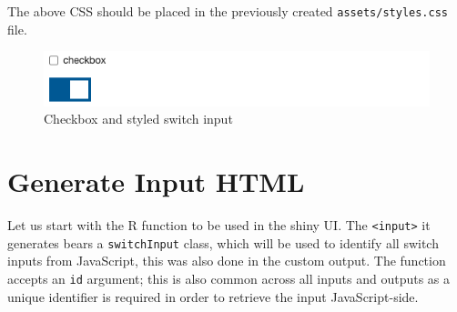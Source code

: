 \documentclass[10pt,]{krantz}
\makeatletter
\newenvironment{Shaded}{\begin{snugshade}}{\end{snugshade}}
\newcommand{\CommentTok}[1]{\textcolor[rgb]{0.37,0.37,0.37}{\textit{#1}}}
\newcommand{\ConstantTok}[1]{\textcolor[rgb]{0,0,0}{#1}}
\newcommand{\ControlFlowTok}[1]{\textcolor[rgb]{0.27,0.27,0.27}{\textbf{#1}}}
\newcommand{\DataTypeTok}[1]{\textcolor[rgb]{0.27,0.27,0.27}{#1}}
\newcommand{\DecValTok}[1]{\textcolor[rgb]{0.06,0.06,0.06}{#1}}
\newcommand{\FunctionTok}[1]{\textcolor[rgb]{0,0,0}{#1}}
\newcommand{\InformationTok}[1]{\textcolor[rgb]{0.37,0.37,0.37}{\textbf{\textit{#1}}}}
\newcommand{\KeywordTok}[1]{\textcolor[rgb]{0.27,0.27,0.27}{\textbf{#1}}}
\newcommand{\NormalTok}[1]{#1}
\newcommand{\OperatorTok}[1]{\textcolor[rgb]{0.43,0.43,0.43}{\textbf{#1}}}
\newcommand{\StringTok}[1]{\textcolor[rgb]{0.5,0.5,0.5}{#1}}
\newenvironment{kframe}{%
\medskip{}
\setlength{\fboxsep}{.8em}
 \def\at@end@of@kframe{}%
 \ifinner\ifhmode%
  \def\at@end@of@kframe{\end{minipage}}%
  \begin{minipage}{\columnwidth}%
 \fi\fi%
 \def\FrameCommand##1{\hskip\@totalleftmargin \hskip-\fboxsep
 \colorbox{shadecolor}{##1}\hskip-\fboxsep
     \hskip-\linewidth \hskip-\@totalleftmargin \hskip\columnwidth}%
 \MakeFramed {\advance\hsize-\width
   \@totalleftmargin\z@ \linewidth\hsize
   \@setminipage}}%
 {\par\unskip\endMakeFramed%
 \at@end@of@kframe}
\renewenvironment{Shaded}{\begin{kframe}}{\end{kframe}}
\makeatother
\begin{document}
\begin{Shaded}
\end{Shaded}

The above CSS should be placed in the previously created \texttt{assets/styles.css} file.

\begin{figure}[H]

{\centering \includegraphics[width=1\linewidth]{images/checkbox-switch} 

}

\caption{Checkbox and styled switch input}\label{fig:checkbox-switch}
\end{figure}

\hypertarget{shiny-input-html}{%
\section{Generate Input HTML}\label{shiny-input-html}}

Let us start with the R function to be used in the shiny UI. The \texttt{\textless{}input\textgreater{}} it generates bears a \texttt{switchInput} class, which will be used to identify all switch inputs from JavaScript, this was also done in the custom output. The function accepts an \texttt{id} argument; this is also common across all inputs and outputs as a unique identifier is required in order to retrieve the input JavaScript-side.

\begin{Shaded}
\end{Shaded}
\end{document}
